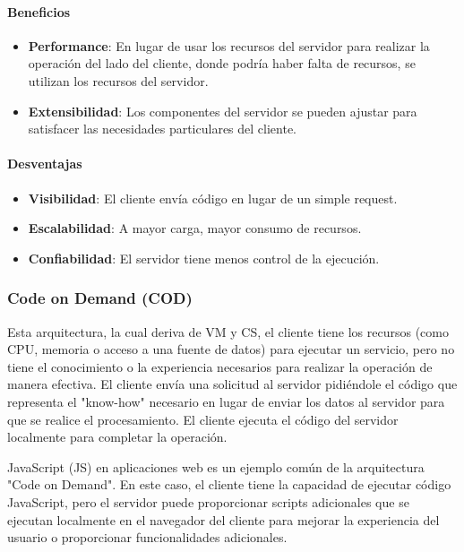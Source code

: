 \documentclass{article}
\begin{document}
		\paragraph{Beneficios}
		\begin{itemize}	
			\item {\textbf{Performance}}: En lugar de usar los recursos del servidor para realizar la operación del lado del cliente, donde podría haber falta de recursos, se utilizan los recursos del servidor.
			
			\item {\textbf{Extensibilidad}}: Los componentes del servidor se pueden ajustar para satisfacer las necesidades particulares del cliente.
			
		\end{itemize}
		
		\paragraph{Desventajas}
			\begin{itemize}	
				\item {\textbf{Visibilidad}}: El cliente envía código en lugar de un simple request.			
				\item {\textbf{Escalabilidad}}: A mayor carga, mayor consumo de recursos.	
				\item {\textbf{Confiabilidad}}: El servidor tiene menos control de la ejecución.	
			\end{itemize}
		
		
		\subsubsection{Code on Demand (COD)}
		Esta arquitectura, la cual deriva de VM y CS, el cliente tiene los recursos (como CPU, memoria o acceso a una fuente de datos) para ejecutar un servicio, pero no tiene el conocimiento o la experiencia necesarios para realizar la operación de manera efectiva. El cliente envía una solicitud al servidor pidiéndole el código que representa el "know-how" necesario en lugar de enviar los datos al servidor para que se realice el procesamiento. El cliente ejecuta el código del servidor localmente para completar la operación.
		
		JavaScript (JS) en aplicaciones web es un ejemplo común de la arquitectura "Code on Demand". En este caso, el cliente tiene la capacidad de ejecutar código JavaScript, pero el servidor puede proporcionar scripts adicionales que se ejecutan localmente en el navegador del cliente para mejorar la experiencia del usuario o proporcionar funcionalidades adicionales.
		
\end{document}
